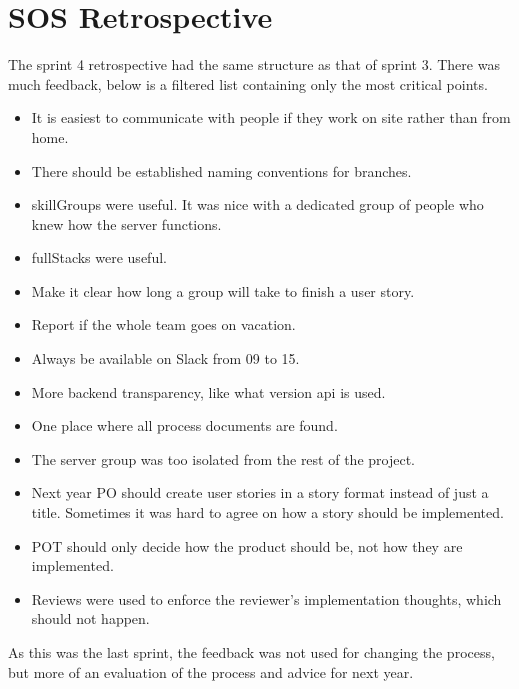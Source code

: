 \section{SOS Retrospective}

The sprint 4 retrospective had the same structure as that of sprint 3. There was much feedback, below is a filtered list containing only the most critical points. 

\begin{itemize}
    \item It is easiest to communicate with people if they work on site rather than from home.
    \item There should be established naming conventions for branches.
    \item \Glspl{skillGroup} were useful. It was nice with a dedicated group of people who knew how the server functions.
    \item \Glspl{fullStack} were useful.
    \item Make it clear how long a group will take to finish a user story.
    \item Report if the whole team goes on vacation.
    \item Always be available on Slack from 09 to 15.
    \item More backend transparency, like what version \gls{api} is used.
    \item One place where all process documents are found.
    \item The server group was too isolated from the rest of the project. 
    \item Next year \gls{PO} should create user stories in a story format instead of just a title. Sometimes it was hard to agree on how a story should be implemented. 
    \item \gls{POT} should only decide how the product should be, not how they are implemented.
    \item Reviews were used to enforce the reviewer's implementation thoughts, which should not happen. 
\end{itemize}

As this was the last sprint, the feedback was not used for changing the process, but more of an evaluation of the process and advice for next year.
